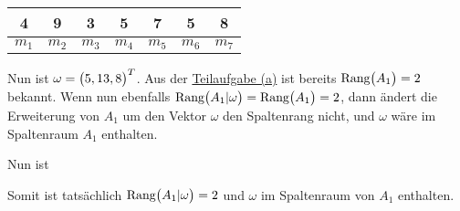 \documentclass{scrreprt}
\begin{document}
\begin{enumerate}[(a)]
  \begin{tabular}{|c|c|c|c|c|c|c|}
    \hline
    4 & 9 & 3 & 5 & 7 & 5 & 8 \\
    \hline
    $m_1$ & $m_2$ & $m_3$ & $m_4$ & $m_5$ & $m_6$ & $m_7$ \\
    \hline
  \end{tabular}

  Nun ist $\omega = \qty\big(5, 13, 8)^T$.
  Aus der \hyperref[n_6_2_a]{Teilaufgabe (a)} ist bereits
  $\text{Rang}\qty\big(A_1) = 2$ bekannt.
  Wenn nun ebenfalls
  $\text{Rang}\qty\big(A_1|\omega) = \text{Rang}\qty\big(A_1) =  2$, dann ändert
  die Erweiterung von $A_1$ um den Vektor $\omega$ den Spaltenrang nicht, und
  $\omega$ wäre im Spaltenraum $A_1$ enthalten.

  Nun ist
  Somit ist tatsächlich $\text{Rang}\qty\big(A_1|\omega) = 2$ und $\omega$ im
  Spaltenraum von $A_1$ enthalten.


\end{enumerate}
\end{document}
